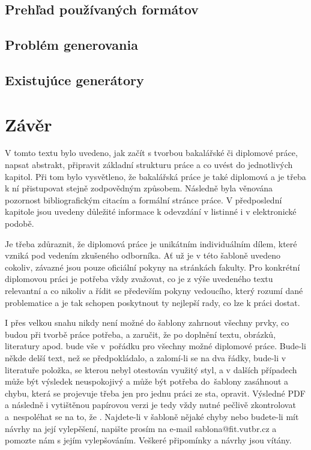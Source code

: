 \section{Prehľad používaných formátov}
\section{Problém generovania}
\section{Existujúce generátory}





\chapter{Závěr}
\label{zaver}

V tomto textu bylo uvedeno, jak začít s tvorbou bakalářské či diplomové práce, napsat abstrakt, připravit základní strukturu práce a co uvést do jednotlivých kapitol. Při tom bylo vysvětleno, že bakalářská práce je také diplomová a je třeba k ní přistupovat stejně zodpovědným způsobem. Následně byla věnována pozornost bibliografickým citacím a formální stránce práce. V předposlední kapitole jsou uvedeny důležité informace k odevzdání v listinné i v elektronické podobě.

Je třeba zdůraznit, že diplomová práce je unikátním individuálním dílem, které vzniká pod vedením zkušeného odborníka. Ať už je v této šabloně uvedeno cokoliv, závazné jsou pouze oficiální pokyny na stránkách fakulty. Pro konkrétní diplomovou práci je potřeba vždy zvažovat, co je z výše uvedeného textu relevantní a co nikoliv a řídit se především pokyny vedoucího, který rozumí dané problematice a je tak schopen poskytnout ty nejlepší rady, co lze k práci dostat.

I přes velkou snahu nikdy není možné do šablony zahrnout všechny prvky, co budou při tvorbě práce potřeba, a zaručit, že po doplnění textu, obrázků, literatury apod. bude vše v~pořádku pro všechny možné diplomové práce. Bude-li někde delší text, než se předpokládalo, a zalomí-li se na dva řádky, bude-li v literatuře položka, se kterou nebyl otestován využitý styl, a v dalších případech může být výsledek neuspokojivý a může být potřeba do~šablony zasáhnout a chybu, která se projevuje třeba jen pro jednu práci ze sta, opravit. Výsledné PDF a následně i vytištěnou papírovou verzi je tedy vždy nutné pečlivě zkontrolovat a~nespoléhat se na to, že . Najdete-li v šabloně nějaké chyby nebo budete-li mít návrhy na její vylepěšení, napište prosím na e-mail sablona@fit.vutbr.cz a pomozte nám s jejím vylepšováním. Veškeré připomínky a návrhy jsou vítány.

